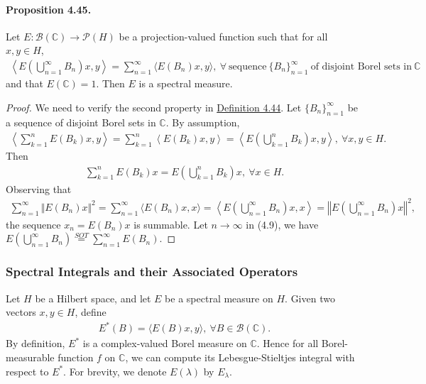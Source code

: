 \documentclass{article}
\begin{document}
\paragraph{Proposition 4.45.\label{prop:4.45}} Let $E:\mathcal{B}(\mathbb{C})\to\mathcal{P}(H)$ be a projection-valued function such that for all $x,y\in H$,
\begin{align*}
	\left\langle E\left(\bigcup_{n=1}^\infty B_n\right)x,y\right\rangle = \sum_{n=1}^\infty \langle E(B_n)x,y\rangle,\ \forall\ \text{sequence}\ \{B_n\}_{n=1}^\infty\ \text{of disjoint Borel sets in}\ \mathbb{C}
\end{align*}
and that $E(\mathbb{C})=1$. Then $E$ is a spectral measure.
\begin{proof}
We need to verify the second property in \hyperref[def:4.44]{Definition 4.44}. Let $\{B_n\}_{n=1}^\infty$ be a sequence of disjoint Borel sets in $\mathbb{C}$. By assumption,
\begin{align*}
	\left\langle \sum_{k=1}^n E(B_k)x,y\right\rangle = \sum_{k=1}^n\left\langle E(B_k)x,y\right\rangle = \left\langle E\left(\bigcup_{k=1}^n B_k\right)x,y\right\rangle,\ \forall x,y\in H.
\end{align*}
Then
\begin{align*}
\sum_{k=1}^n E(B_k)x = E\left(\bigcup_{k=1}^n B_k\right)x,\ \forall x\in H.\tag{4.9}\label{eq:4.9}
\end{align*}
Observing that
\begin{align*}
	\sum_{n=1}^\infty\Vert E(B_n)x\Vert^2 = \sum_{n=1}^\infty\langle E(B_n)x,x\rangle = \left\langle E\left(\bigcup_{n=1}^\infty B_n\right)x,x\right\rangle = \left\Vert E\left(\bigcup_{n=1}^\infty B_n\right)x\right\Vert^2,
\end{align*}
the sequence $x_n=E(B_n)x$ is summable. Let $n\to\infty$ in (4.9), we have $E\left(\bigcup_{n=1}^\infty B_n\right) \overset{SOT}{=} \sum_{n=1}^\infty E(B_n)$.
\end{proof}

\subsubsection{Spectral Integrals and their Associated Operators}
Let $H$ be a Hilbert space, and let $E$ be a spectral measure on $H$. Given two vectors $x,y\in H$, define
\begin{align*}
	E^*(B) = \langle E(B)x,y\rangle,\ \forall B\in\mathscr{B}(\mathbb{C}).
\end{align*}
By definition, $E^*$ is a complex-valued Borel measure on $\mathbb{C}$. Hence for all Borel-measurable function $f$ on $\mathbb{C}$, we can compute its Lebesgue-Stieltjes integral with respect to $E^*$. For brevity, we denote $E(\lambda)$ by $E_\lambda$.
\end{document}

